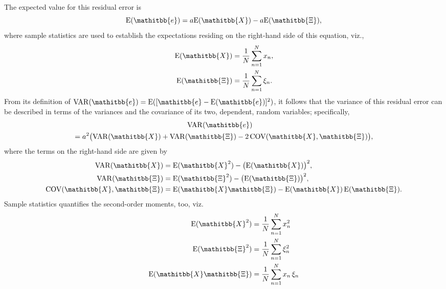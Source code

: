 \documentclass[twocolumn,twoside,fleqn,12pt]{article}
\newcommand{\viz}{viz.,\xspace}
\newcommand{\vecMtx}[1]{\ensuremath{\mathitbb{#1}}}
\newcommand{\grkMtx}[1]{\ensuremath{\mathitbb{#1}}}
\begin{document}
The expected value for this residual error is
\begin{displaymath}
   \mathrm{E} ( \vecMtx{e} ) = a \mathrm{E} ( \vecMtx{X} ) -
   a \mathrm{E} ( \grkMtx{\Xi} )  ,
\end{displaymath}
where sample statistics are used to establish the expectations
residing on the right-hand side of this equation, \viz
\begin{displaymath}
   \begin{aligned}
      \mathrm{E} ( \vecMtx{X} ) & = \frac{1}{N} \sum_{n=1}^N x_n , \\
      \mathrm{E} ( \grkMtx{\Xi}  ) & =
      \frac{1}{N} \sum_{n=1}^N \xi_n  .
   \end{aligned}
\end{displaymath}
From its definition of $\mathrm{VAR} ( \vecMtx{e} ) = \mathrm{E}
( [ \vecMtx{e} - \mathrm{E} ( \vecMtx{e} ) ]^2 )$,
it follows that the variance of this residual error can be described
in terms of the variances and the covariance of its two, dependent, random
variables; specifically,
\begin{multline*}
   \mbox{} \hspace{-4mm} \mathrm{VAR}( \vecMtx{e} ) \\
   = a^2 \bigl( \mathrm{VAR} ( \vecMtx{X} ) +
   \mathrm{VAR} ( \grkMtx{\Xi} ) - 2 \, \mathrm{COV} ( \vecMtx{X} ,
   \grkMtx{\Xi} ) \bigr) ,
\end{multline*}
where the terms on the right-hand side are given by
\begin{displaymath}
   \begin{aligned}
      \mathrm{VAR} ( \vecMtx{X} ) & = \mathrm{E} ( \vecMtx{X}^2 ) -
      \bigl( \mathrm{E} ( \vecMtx{X} ) \bigr)^2 , \\
      \mathrm{VAR} ( \grkMtx{\Xi} ) & = \mathrm{E} ( \grkMtx{\Xi}^2 ) -
      \bigl( \mathrm{E} ( \grkMtx{\Xi} ) \bigr)^2 , \\
      \mathrm{COV} ( \vecMtx{X} , \grkMtx{\Xi} ) & =
      \mathrm{E} ( \vecMtx{X} \grkMtx{\Xi} ) - \mathrm{E} ( \vecMtx{X} )
      \, \mathrm{E} ( \grkMtx{\Xi} ) .
   \end{aligned}
\end{displaymath}
Sample statistics quantifies the second-order moments, too, viz.
\begin{displaymath}
   \begin{aligned}
      \mathrm{E} ( \vecMtx{X}^2 ) & = \frac{1}{N} \sum_{n=1}^N x_n^2  \\
      \mathrm{E} ( \grkMtx{\Xi}^2 ) & =
      \frac{1}{N} \sum_{n=1}^N \xi_n^2  \\
      \mathrm{E} ( \vecMtx{X} \grkMtx{\Xi} ) & =
      \frac{1}{N} \sum_{n=1}^N x_n \, \xi_n
   \end{aligned}
\end{displaymath}
\end{document}
